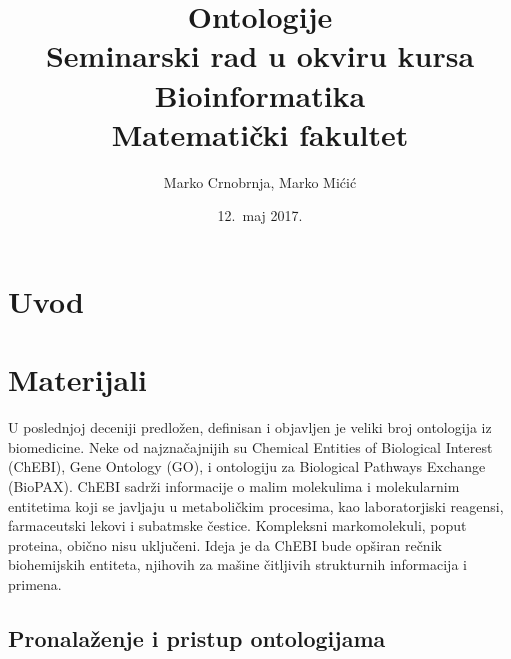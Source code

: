 \documentclass[a4paper]{article}
\begin{document}
\title{Ontologije \\ \small{Seminarski rad u okviru kursa\\Bioinformatika\\ Matematički fakultet}}

\author{Marko Crnobrnja, Marko Mićić}
\date{12.~maj 2017.}
\maketitle

\abstract{}


\newpage
\tableofcontents

\newpage

\section{Uvod}
\label{sec:uvod}

\section{Materijali}

U poslednjoj deceniji predložen, definisan i objavljen je veliki broj ontologija iz biomedicine.
Neke od najznačajnijih su Chemical Entities of Biological Interest (ChEBI), Gene Ontology (GO), 
i ontologiju za Biological Pathways Exchange (BioPAX). ChEBI sadrži informacije o malim molekulima i molekularnim entitetima 
koji se javljaju u metaboličkim procesima, kao laboratorjiski reagensi, farmaceutski lekovi i subatmske čestice.
 Kompleksni markomolekuli, poput proteina, obično nisu uključeni. Ideja je da ChEBI bude opširan rečnik biohemijskih entiteta, njihovih
za mašine čitljivih strukturnih informacija i primena.

\subsection{Pronalaženje i pristup ontologijama}
\end{document}
